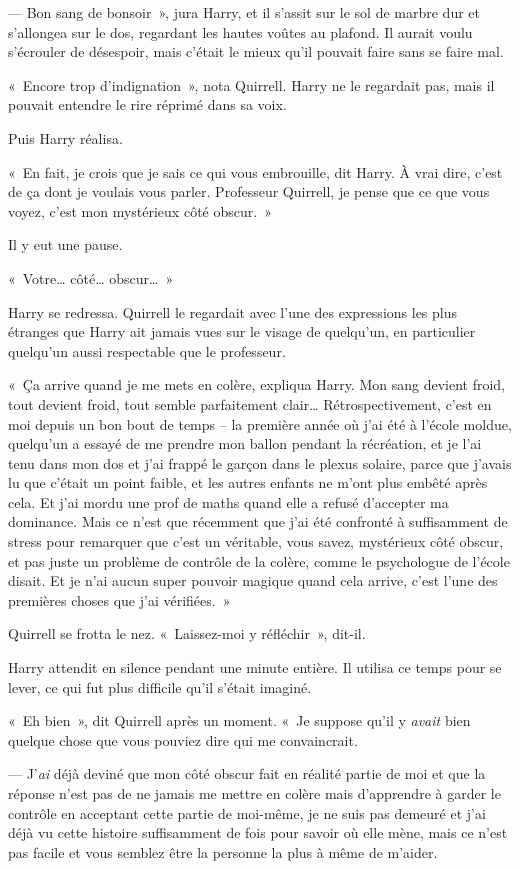 --- Bon sang de bonsoir~», jura Harry, et il s'assit sur le sol de marbre dur et s'allongea sur le dos, regardant les hautes voûtes au plafond.
Il aurait voulu s'écrouler de désespoir, mais c'était le mieux qu'il pouvait faire sans se faire mal.

«~Encore trop d'indignation~», nota Quirrell.
Harry ne le regardait pas, mais il pouvait entendre le rire réprimé dans sa voix.

Puis Harry réalisa.

«~En fait, je crois que je sais ce qui vous embrouille, dit Harry.
À vrai dire, c'est de ça dont je voulais vous parler.
Professeur Quirrell, je pense que ce que vous voyez, c'est mon mystérieux côté obscur.~»

Il y eut une pause.

«~Votre… côté… obscur…~»

Harry se redressa.
Quirrell le regardait avec l'une des expressions les plus étranges que Harry ait jamais vues sur le visage de quelqu'un, en particulier quelqu'un aussi respectable que le professeur.

«~Ça arrive quand je me mets en colère, expliqua Harry.
Mon sang devient froid, tout devient froid, tout semble parfaitement clair…
Rétrospectivement, c'est en moi depuis un bon bout de temps -- la première année où j'ai été à l'école moldue, quelqu'un a essayé de me prendre mon ballon pendant la récréation, et je l'ai tenu dans mon dos et j'ai frappé le garçon dans le plexus solaire, parce que j'avais lu que c'était un point faible, et les autres enfants ne m'ont plus embêté après cela.
Et j'ai mordu une prof de maths quand elle a refusé d'accepter ma dominance.
Mais ce n'est que récemment que j'ai été confronté à suffisamment de stress pour remarquer que c'est un véritable, vous savez, mystérieux côté obscur, et pas juste un problème de contrôle de la colère, comme le psychologue de l'école disait.
Et je n'ai aucun super pouvoir magique quand cela arrive, c'est l'une des premières choses que j'ai vérifiées.~»


Quirrell se frotta le nez.
«~Laissez-moi y réfléchir~», dit-il.

Harry attendit en silence pendant une minute entière.
Il utilisa ce temps pour se lever, ce qui fut plus difficile qu'il s'était imaginé.

«~Eh bien~», dit Quirrell après un moment.
«~Je suppose qu'il y \emph{avait} bien quelque chose que vous pouviez dire qui me convaincrait.

--- J'\emph{ai} déjà deviné que mon côté obscur fait en réalité partie de moi et que la réponse n'est pas de ne jamais me mettre en colère mais d'apprendre à garder le contrôle en acceptant cette partie de moi-même, je ne suis pas demeuré et j'ai déjà vu cette histoire suffisamment de fois pour savoir où elle mène, mais ce n'est pas facile et vous semblez être la personne la plus à même de m'aider.

